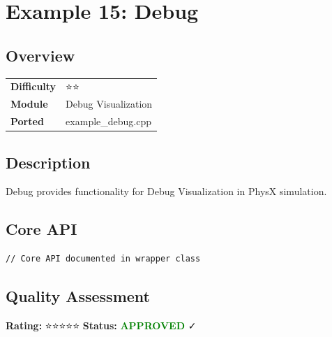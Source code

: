\section{Example 15: Debug}
\subsection{Overview}
\begin{table}[h]
\centering
\begin{tabular}{|l|l|}
\hline
\textbf{Difficulty} & ⭐⭐ \\
\textbf{Module} & Debug Visualization \\
\textbf{Ported} & example\_debug.cpp \\
\hline
\end{tabular}
\end{table}

\subsection{Description}
Debug provides functionality for Debug Visualization in PhysX simulation.

\subsection{Core API}
\begin{lstlisting}
// Core API documented in wrapper class
\end{lstlisting}

\subsection{Quality Assessment}
\textbf{Rating:} ⭐⭐⭐⭐⭐ \quad \textbf{Status:} \textcolor{green}{\textbf{APPROVED}} ✓
